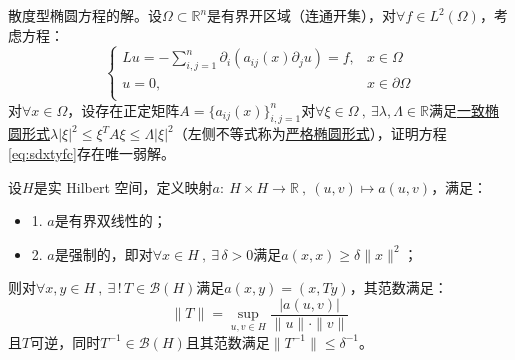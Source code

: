 \begin{example}
\quad 散度型椭圆方程的解。设$\Omega \subset \mathbb{R}^n$是有界开区域（连通开集），对$\forall f \in L^2(\Omega)$，考虑方程：
\begin{equation}\label{eq:sdxtyfc}
\left\{\begin{array}{rl}
Lu =-\sum_{i,j=1}^{n}\partial_i(a_{ij}(x)\partial_ju)=f, & x \in \Omega \\
u = 0, & x \in \partial\Omega \\
\end{array}\right.
\end{equation}
对$\forall x \in \Omega$，设存在正定矩阵$A=\{a_{ij}(x)\}_{i,j=1}^n$对$\forall \xi \in \Omega \ , \ \exists \lambda,\Lambda \in \mathbb{R}$满足\href{https://math.fandom.com/zh/wiki/%E4%BA%8C%E9%98%B6%E6%A4%AD%E5%9C%86%E5%9E%8B%E6%96%B9%E7%A8%8B/%E6%9E%81%E5%80%BC%E5%8E%9F%E7%90%86}{一致椭圆形式}$\lambda|\xi|^2 \leq \xi^{T}A\xi \leq \Lambda |\xi|^2$（左侧不等式称为\href{https://math.fandom.com/zh/wiki/%E4%BA%8C%E9%98%B6%E6%A4%AD%E5%9C%86%E5%9E%8B%E6%96%B9%E7%A8%8B/%E6%9E%81%E5%80%BC%E5%8E%9F%E7%90%86}{严格椭圆形式}），证明方程\eqref{eq:sdxtyfc}存在唯一弱解。
\end{example}
\begin{theorem}\label{theorem:Lax-Milgram}
设$H$是实 Hilbert 空间，定义映射$a: \ H \times H \to \mathbb{R} \ , \ (u,v) \mapsto a(u,v)$，满足：
\begin{itemize}
    \item 1. $a$是有界双线性的；
    \item 2. $a$是强制的，即对$\forall x \in H \ , \ \exists \, \delta>0$满足$a(x,x) \geq \delta\|x\|^2$；
\end{itemize}
则对$\forall x,y \in H \ , \ \exists \, ! \, T \in \mathscr{B}(H)$满足$a(x,y)=(x,Ty)$，其范数满足：
\[\|T\|=\sup_{u,v \in H}\frac{|a(u,v)|}{\|u\|\cdot\|v\|}\]
且$T$可逆，同时$T^{-1} \in \mathscr{B}(H)$且其范数满足$\|T^{-1}\|\leq \delta^{-1}$。
\end{theorem}

